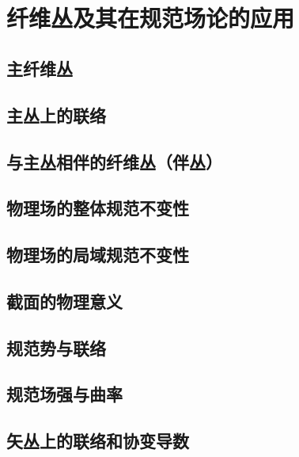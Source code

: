 \chapter[纤维丛及其在规范场论的应用]{\\纤维丛及其在规范场论的应用}

\section{主纤维丛}

\section{主丛上的联络}

\section{与主丛相伴的纤维丛（伴丛）}

\section{物理场的整体规范不变性}

\section{物理场的局域规范不变性}

\section{截面的物理意义}

\section{规范势与联络}

\section{规范场强与曲率}

\section{矢丛上的联络和协变导数}
